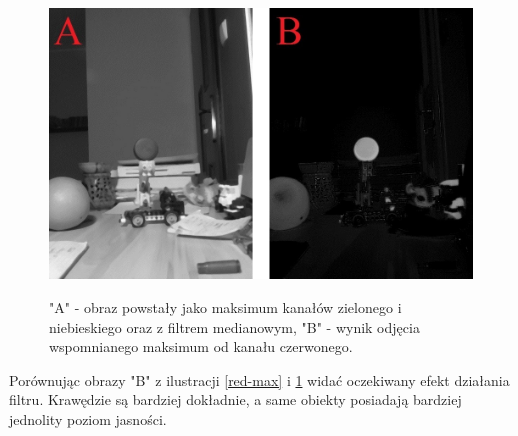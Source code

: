 \begin{figure}[H]
\begin{center}
\includegraphics[scale=0.42]{imgs/imgMax+RwoBG_med.jpg}
\caption[Kanał czerwony po odjęciu maksimum kanału zielonego i niebieskiego z filtrem medianowym.]\small{"A" - obraz powstały jako maksimum kanałów zielonego i niebieskiego oraz z filtrem medianowym, "B" - wynik odjęcia wspomnianego maksimum od kanału czerwonego.}
\label{red-maxM}
\end{center}
\end{figure}
Porównując obrazy "B" z ilustracji \ref{red-max} i \ref{red-maxM} widać oczekiwany efekt działania filtru. Krawędzie są bardziej dokładnie, a same obiekty posiadają bardziej jednolity poziom jasności.


